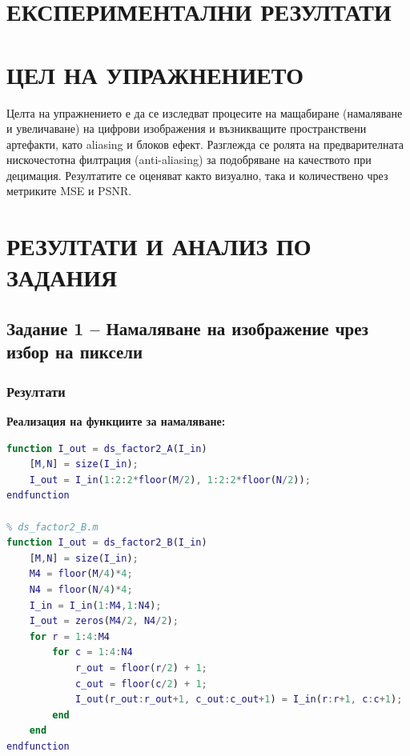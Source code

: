 \documentclass[12pt]{article}
\begin{document}
\section{ЕКСПЕРИМЕНТАЛНИ РЕЗУЛТАТИ}
\section{ЦЕЛ НА УПРАЖНЕНИЕТО}
Целта на упражнението е да се изследват процесите на мащабиране (намаляване и увеличаване) на цифрови изображения и възникващите пространствени артефакти, като aliasing и блоков ефект. Разглежда се ролята на предварителната нискочестотна филтрация (anti-aliasing) за подобряване на качеството при децимация. Резултатите се оценяват както визуално, така и количествено чрез метриките MSE и PSNR.

\section{РЕЗУЛТАТИ И АНАЛИЗ ПО ЗАДАНИЯ}

\subsection{Задание 1 – Намаляване на изображение чрез избор на пиксели}
\subsubsection{Резултати}

\textbf{Реализация на функциите за намаляване:}
\begin{lstlisting}[language=Matlab]
% ds_factor2_A.m
function I_out = ds_factor2_A(I_in)
    [M,N] = size(I_in);
    I_out = I_in(1:2:2*floor(M/2), 1:2:2*floor(N/2));
endfunction

% ds_factor2_B.m
function I_out = ds_factor2_B(I_in)
    [M,N] = size(I_in);
    M4 = floor(M/4)*4;
    N4 = floor(N/4)*4;
    I_in = I_in(1:M4,1:N4);
    I_out = zeros(M4/2, N4/2);
    for r = 1:4:M4
        for c = 1:4:N4
            r_out = floor(r/2) + 1;
            c_out = floor(c/2) + 1;
            I_out(r_out:r_out+1, c_out:c_out+1) = I_in(r:r+1, c:c+1);
        end
    end
endfunction
\end{lstlisting}
\end{document}
